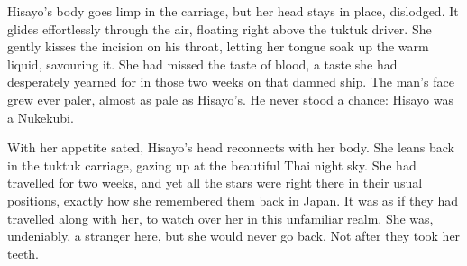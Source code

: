 Hisayo's body goes limp in the carriage, but her head stays in place, dislodged.
It glides effortlessly through the air, floating right above the tuktuk driver.
She gently kisses the incision on his throat, letting her tongue soak up the warm liquid, savouring it.
She had missed the taste of blood, a taste she had desperately yearned for in those two weeks on that damned ship.
The man's face grew ever paler, almost as pale as Hisayo's.
He never stood a chance: Hisayo was a Nukekubi.

With her appetite sated, Hisayo's head reconnects with her body.
She leans back in the tuktuk carriage, gazing up at the beautiful Thai night sky.
She had travelled for two weeks, and yet all the stars were right there in their usual positions, exactly how she remembered them back in Japan.
It was as if they had travelled along with her, to watch over her in this unfamiliar realm.
She was, undeniably, a stranger here, but she would never go back.
Not after they took her teeth.